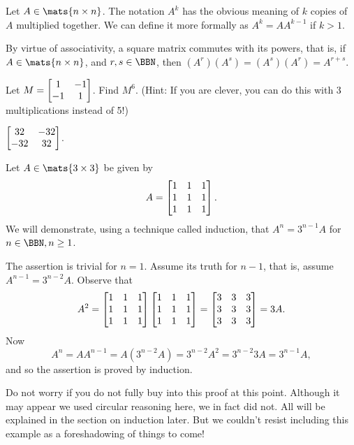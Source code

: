 \begin{df}
Let $A \in \mats{n\times n}$.
The notation $A^k$ has the obvious
meaning of $k$ copies of $A$ multiplied together.
We can define it more formally as $A^k=AA^{k-1}$ if $k>1$.
\end{df}


\begin{rem}
By virtue of associativity, a square matrix commutes with its
powers, that is, if $A\in\mats{n\times n}$, and 
$r,s\in\BBN$, then $(A^r)(A^s) = (A^s)(A^r) = A^{r + s}$.
\end{rem}

\begin{exer}
Let $M = \begin{bmatrix} 1 & -1  \cr -1 & 1 \cr\end{bmatrix}$.
Find $M^6$.
(Hint: If you are clever, you can do this with 3 multiplications
instead of 5!)
\vspace*{2.5in}
\begin{answer} $ \begin{bmatrix} 32 & -32  \cr -32 & 32 \cr\end{bmatrix}$.\end{answer}
\end{exer}

\begin{exa}
Let $A\in\mats{3\times 3}$ be given by$$A =
\begin{bmatrix} 1 & 1 & 1 \cr 1 & 1 & 1 \cr 1 & 1 & 1 \cr
\end{bmatrix}.$$
We will demonstrate, using a technique called induction, 
that  $A^n = 3^{n - 1}A$ for $n \in \BBN , n \geq
1$.
 \begin{sol} The assertion is trivial for $n = 1$.
Assume its truth for $n -1$, that is, assume $A^{n - 1} = 3^{n -
2}A$. Observe that
$$A^2 = \begin{bmatrix} 1 & 1 & 1 \cr 1 & 1 & 1 \cr 1 & 1 & 1 \cr
\end{bmatrix}\begin{bmatrix} 1 & 1 & 1 \cr 1 & 1 & 1 \cr 1 & 1 & 1 \cr
\end{bmatrix} = \begin{bmatrix} 3 & 3 & 3 \cr 3 & 3 & 3 \cr 3 & 3 & 3 \cr
\end{bmatrix} = 3A.$$
Now
$$A^n = AA^{n - 1} = A(3^{n - 2}A) = 3^{n - 2}A^2 = 3^{n - 2}3A = 3^{n - 1}A, $$
and so the assertion is proved by induction.
\end{sol}
Do not worry if you do not fully buy into this proof at this point.
Although it may appear we used circular reasoning here, we
in fact did not. All will be explained in the section on induction later.
But we couldn't resist including this example as a foreshadowing
of things to come!
\end{exa}




